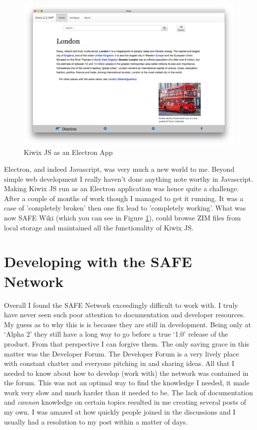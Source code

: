 \begin{figure}[h]
	\begin{center}
		\includegraphics[width=\textwidth]{images/kiwix-js-electron}
		\caption{Kiwix JS as an Electron App}
		\label{fig:kiwix-js-electron}
	\end{center}
\end{figure}

Electron, and indeed Javascript, was very much a new world to me. Beyond simple web development I really haven't done anything note worthy in Javascript. Making Kiwix JS run as an Electron application was hence quite a challenge. After a couple of months of work though I managed to get it running. It was a case of 'completely broken' then one fix lead to 'completely working'. What was now SAFE Wiki (which you can see in Figure \ref{fig:kiwix-js-electron}), could browse ZIM files from local storage and maintained all the functionality of Kiwix JS.

\section{Developing with the SAFE Network}

Overall I found the SAFE Network exceedingly difficult to work with. I truly have never seen such poor attention to documentation and developer resources. My guess as to why this is is because they are still in development. Being only at `Alpha 2' they still have a long way to go before a true `1.0' release of the product. From that perspective I can forgive them. The only saving grace in this matter was the Developer Forum. The Developer Forum is a very lively place with constant chatter and everyone pitching in and sharing ideas. All that I needed to know about how to develop (work with) the network was contained in the forum. This was not an optimal way to find the knowledge I needed, it made work very slow and much harder than it needed to be. The lack of documentation and \textit{cannon} knowledge on certain topics resulted in me creating several posts of my own. I was amazed at how quickly people joined in the discussions and I usually had a resolution to my post within a matter of days.

